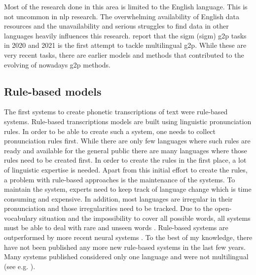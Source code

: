 Most of the research done in this area is limited to the English language. This is not uncommon in \ac{nlp} research. The overwhelming availability of English data resources and the unavailability and serious struggles to find data in other languages heavily influences this research. \citet{Ashby&Bartley.2021} report that the \acs{sigm} (\acl{sigm}) \ac{g2p} tasks in 2020 and 2021 is the first attempt to tackle multilingual \ac{g2p}. While these are very recent tasks, there are earlier models and methods that contributed to the evolving of nowadays \ac{g2p} methods.

\subsection{Rule-based models}
The first systems to create phonetic transcriptions of text were rule-based systems. Rule-based transcriptions models are built using linguistic pronunciation rules. In order to be able to create such a system, one needs to collect pronunciation rules first. While there are only few languages where such rules are ready and available for the general public there are many languages where those rules need to be created first. In order to create the rules in the first place, a lot of linguistic expertise is needed. Apart from this initial effort to create the rules, a problem with rule-based approaches is the maintenance of the systems. To maintain the system, experts need to keep track of language change which is time consuming and expensive. In addition, most languages are irregular in their pronunciation and those irregularities need to be tracked. Due to the open-vocabulary situation and the impossibility to cover all possible words, all systems must be able to deal with rare and unseen words \citep{Rao2015GraphemetophonemeCU, ney-joint-sequence2008}. Rule-based systems are outperformed by more recent neural systems \citep{gorman-etal-2020-sigmorphon, Ashby&Bartley.2021}. 
To the best of my knowledge, there have not been published any more new rule-based systems in the last few years. Many systems published considered only one language and were not multilingual (see e.g. \citet{rule-based2009}).

\citep{Rao2015GraphemetophonemeCU}

\citep{ney-joint-sequence2008}



